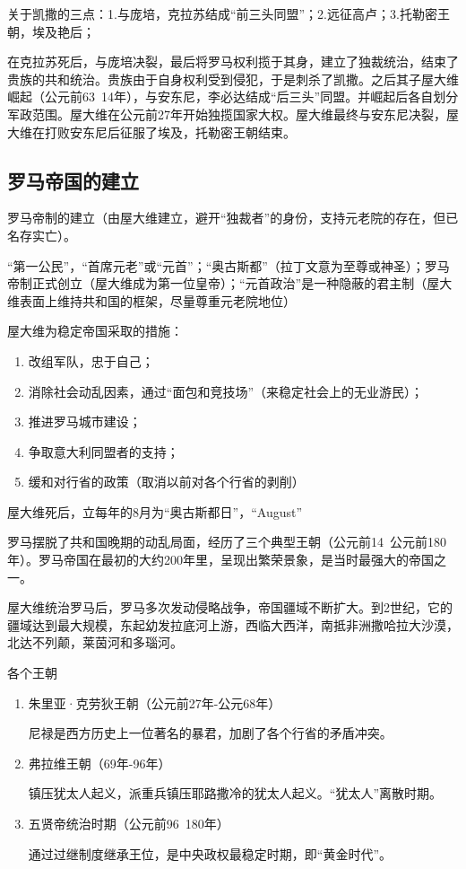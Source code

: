关于凯撒的三点：1.与庞培，克拉苏结成“前三头同盟”；2.远征高卢；3.托勒密王朝，埃及艳后；

在克拉苏死后，与庞培决裂，最后将罗马权利揽于其身，建立了独裁统治，结束了贵族的共和统治。贵族由于自身权利受到侵犯，于是刺杀了凯撒。之后其子屋大维崛起（公元前63~14年），与安东尼，李必达结成“后三头”同盟。并崛起后各自划分军政范围。屋大维在公元前27年开始独揽国家大权。屋大维最终与安东尼决裂，屋大维在打败安东尼后征服了埃及，托勒密王朝结束。

\subsection{罗马帝国的建立}

罗马帝制的建立（由屋大维建立，避开“独裁者”的身份，支持元老院的存在，但已名存实亡）。

“第一公民”，“首席元老”或“元首”；“奥古斯都”（拉丁文意为至尊或神圣）；罗马帝制正式创立（屋大维成为第一位皇帝）；“元首政治”是一种隐蔽的君主制（屋大维表面上维持共和国的框架，尽量尊重元老院地位）

屋大维为稳定帝国采取的措施：
\begin{enumerate}
    \item 改组军队，忠于自己；
    \item 消除社会动乱因素，通过“面包和竞技场”（来稳定社会上的无业游民）；
    \item 推进罗马城市建设；
    \item 争取意大利同盟者的支持；
    \item 缓和对行省的政策（取消以前对各个行省的剥削）
\end{enumerate}

屋大维死后，立每年的8月为“奥古斯都日”，“August”

罗马摆脱了共和国晚期的动乱局面，经历了三个典型王朝（公元前14~公元前180年）。罗马帝国在最初的大约200年里，呈现出繁荣景象，是当时最强大的帝国之一。

屋大维统治罗马后，罗马多次发动侵略战争，帝国疆域不断扩大。到2世纪，它的疆域达到最大规模，东起幼发拉底河上游，西临大西洋，南抵非洲撒哈拉大沙漠，北达不列颠，莱茵河和多瑙河。

各个王朝

\begin{enumerate}
    \item 朱里亚·克劳狄王朝（公元前27年-公元68年）
    
尼禄是西方历史上一位著名的暴君，加剧了各个行省的矛盾冲突。 

\item 弗拉维王朝（69年-96年）

镇压犹太人起义，派重兵镇压耶路撒冷的犹太人起义。“犹太人”离散时期。

\item 五贤帝统治时期（公元前96~180年）

通过过继制度继承王位，是中央政权最稳定时期，即“黄金时代”。
    
\end{enumerate}

